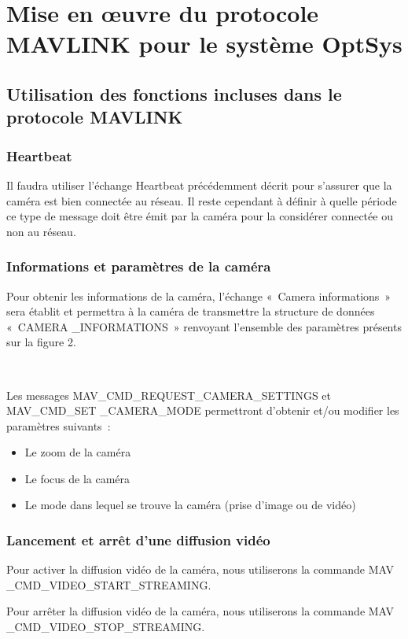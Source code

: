 \newpage
\section{Mise en œuvre du protocole MAVLINK pour le système OptSys}
\subsection{Utilisation des fonctions incluses dans le protocole MAVLINK}
\subsubsection{Heartbeat}
Il faudra utiliser l'échange Heartbeat précédemment décrit pour s'assurer que la caméra est bien connectée au réseau. Il reste cependant à définir à quelle période ce type de message doit être émit par la caméra pour la considérer connectée ou non au réseau.
\subsubsection{Informations et paramètres de la caméra}
Pour obtenir les informations de la caméra, l’échange « Camera informations » sera établit et permettra à la caméra de transmettre la structure de données « CAMERA
\_INFORMATIONS » renvoyant l’ensemble des paramètres présents sur la figure 2.

\

Les messages MAV\_CMD\_REQUEST\_CAMERA\_SETTINGS et MAV\_CMD\_SET
\_CAMERA\_MODE permettront d’obtenir et/ou modifier les paramètres suivants :
\begin{itemize}
	\item Le zoom de la caméra
	\item Le focus de la caméra
	\item Le mode dans lequel se trouve la caméra (prise d’image ou de vidéo)

\end{itemize}


\subsubsection{Lancement et arrêt d'une diffusion vidéo}

Pour activer la diffusion vidéo de la caméra, nous utiliserons la commande MAV
\_CMD\_VIDEO\_START\_STREAMING.
\newline 
\par
    Pour arrêter  la diffusion vidéo de la caméra, nous utiliserons la commande MAV
\_CMD\_VIDEO\_STOP\_STREAMING.

